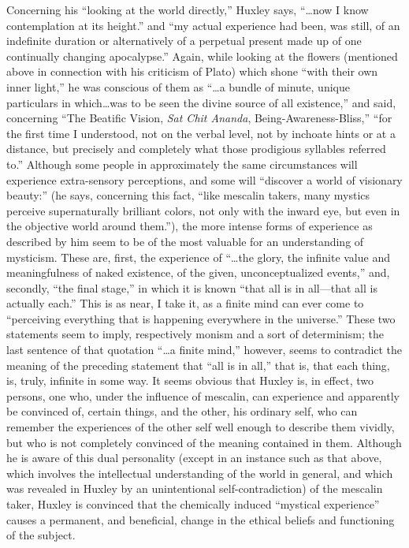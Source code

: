 Concerning his \enquote{looking at the world directly,} Huxley
says, \enquote{\dots now I know contemplation at its height.}\supercite{huxley:doors-of-perception}
and \enquote{my actual experience had been, was still, of an indefinite
duration or alternatively of a perpetual present\footnotemark
made up of one continually changing apocalypse.}\supercite{huxley:doors-of-perception}
Again, while looking at the flowers (mentioned above in connection with his criticism of Plato)
which shone \enquote{with their own inner light,}
he was conscious of them as \enquote{\dots a bundle of minute, unique particulars\footnotemark
in which\dots was to be seen the divine source of all existence,}\supercite{huxley:doors-of-perception}
and said, concerning \enquote{The Beatific Vision, \emph{Sat Chit Ananda}, Being-Awareness-Bliss,} \enquote{for the first
time I understood, not on the verbal level, not by inchoate hints or
at a distance, but precisely and completely what those
prodigious syllables referred to.}\supercite{huxley:doors-of-perception}
Although some people in approximately the same circumstances will experience extra-sensory
perceptions, and some will \enquote{discover a world of visionary beauty:} (he says, concerning this
fact, \enquote{like mescalin takers, many mystics perceive supernaturally brilliant colors,
not only with the inward eye, but even in the objective world around them.}),\supercite{huxley:doors-of-perception}
the more intense forms of experience as described by him seem to be of the most valuable for an understanding of mysticism. These are, first, the experience
of \enquote{\dots the glory, the infinite value and meaningfulness of naked existence, of the given, unconceptualized events,}\supercite{huxley:doors-of-perception}
and, secondly, \enquote{the final stage,} in which it is known \enquote{that
all is in all---that all is actually each.}
This is as near, I take it, as a finite mind can ever come to \enquote{perceiving everything that is
happening everywhere in the universe.}\supercite{huxley:doors-of-perception}
These two statements seem to imply, respectively monism and a sort of determinism;
the last sentence of that quotation \enquote{\dots a finite mind,} however,
seems to contradict the meaning of the preceding statement
that \enquote{all is in all,} that is, that each thing, is,
truly, infinite in some way. It seems obvious that Huxley is, in
effect, two persons, one who, under the influence of mescalin, can
experience and apparently be convinced of, certain things, and
the other, his ordinary self, who can remember the experiences
of the other self well enough to describe them vividly, but who is not
completely convinced of the meaning contained in them. Although he is aware of
this dual personality (except in an instance such as that
above, which involves the intellectual understanding of the world in
general, and which was revealed in Huxley by an
unintentional self-contradiction) of the mescalin taker,
Huxley is convinced that the chemically induced \enquote{mystical experience} causes
a permanent, and beneficial, change in the ethical beliefs
and functioning of the subject.\supercite{huxley:doors-of-perception}

